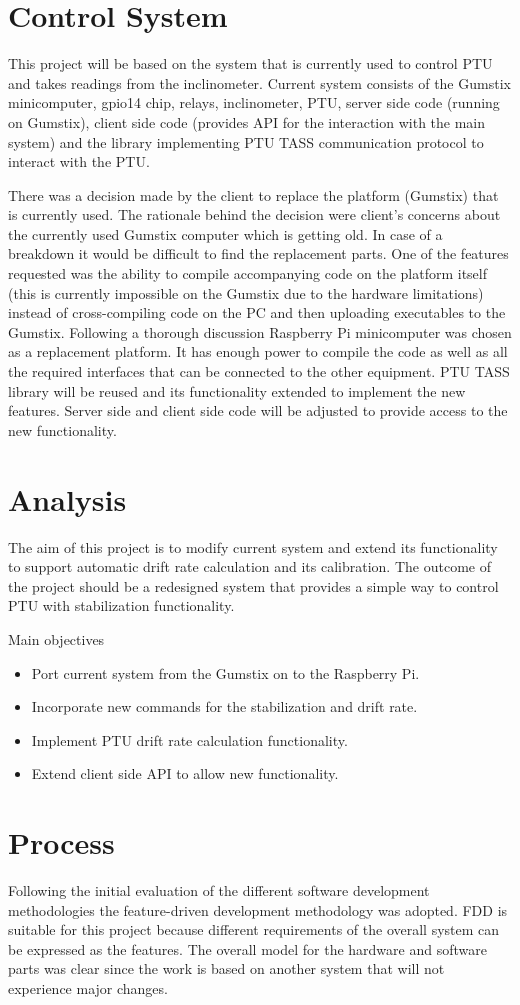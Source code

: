 \section{Control System}
This project will be based on the system that is currently used to control PTU and takes readings from the inclinometer. Current system consists of the Gumstix minicomputer, gpio14 chip, relays, inclinometer, PTU, server side code (running on Gumstix), client side code (provides API for the interaction with the main system) and the library implementing PTU TASS communication protocol to interact with the PTU.

There was a decision made by the client to replace the platform (Gumstix) that is currently used. The rationale behind the decision were client's concerns about the currently used Gumstix computer which is getting old. In case of a breakdown it would be difficult to find the replacement parts. One of the features requested was the ability to compile accompanying code on the platform itself (this is currently impossible on the Gumstix due to the hardware limitations) instead of cross-compiling code on the PC and then uploading executables to the Gumstix. Following a thorough discussion Raspberry Pi minicomputer was chosen as a replacement platform. It has enough power to compile the code as well as all the required interfaces that can be connected to the other equipment. PTU TASS library will be reused and its functionality extended to implement the new features. Server side and client side code will be adjusted to provide access to the new functionality.

\section{Analysis}
The aim of this project is to modify current system and extend its functionality to support automatic drift rate calculation and its calibration. The outcome of the project should be a redesigned system that provides a simple way to control PTU with stabilization functionality.

Main objectives
\begin{itemize}
\item Port current system from the Gumstix on to the Raspberry Pi.
\item Incorporate new commands for the stabilization and drift rate.
\item Implement PTU drift rate calculation functionality.
\item Extend client side API to allow new functionality.
\end{itemize}

\section{Process}
Following the initial evaluation of the different software development methodologies the feature-driven development methodology was adopted. FDD is suitable for this project because different requirements of the overall system can be expressed as the features. The overall model for the hardware and software parts was clear since the work is based on another system that will not experience major changes.
  